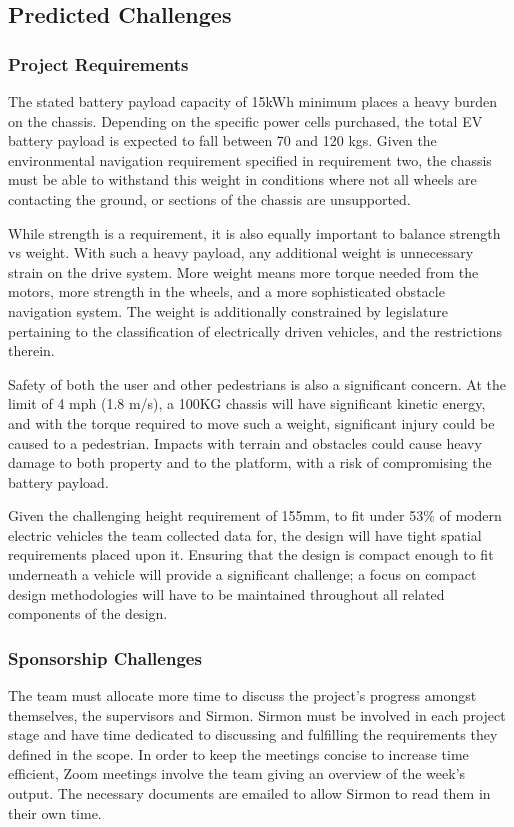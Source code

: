\documentclass [12pt]{article}
\begin{document}
\subsection{Predicted Challenges}\label{sec:predicted_challenges}

\subsubsection{Project Requirements}
The stated battery payload capacity of 15kWh minimum places a heavy burden on the chassis. Depending on the specific power cells purchased, the total EV battery payload is expected to fall between 70 and 120 kgs. Given the environmental navigation requirement specified in requirement two, the chassis must be able to withstand this weight in conditions where not all wheels are contacting the ground, or sections of the chassis are unsupported.

While strength is a requirement, it is also equally important to balance strength vs weight. With such a heavy payload, any additional weight is unnecessary strain on the drive system. More weight means more torque needed from the motors, more strength in the wheels, and a more sophisticated obstacle navigation system. The weight is additionally constrained by legislature pertaining to the classification of electrically driven vehicles, and the restrictions therein.

Safety of both the user and other pedestrians is also a significant concern. At the limit of 4 mph (1.8 m/s), a 100KG chassis will have significant kinetic energy, and with the torque required to move such a weight, significant injury could be caused to a pedestrian. Impacts with terrain and obstacles could cause heavy damage to both property and to the platform, with a risk of compromising the battery payload.

Given the challenging height requirement of 155mm, to fit under 53\% of modern electric vehicles   the team collected data for, the design will have tight spatial requirements placed upon it. Ensuring that the design is compact enough to fit underneath a vehicle will provide a significant challenge; a focus on compact design methodologies will have to be maintained throughout all related components of the design.


\subsubsection{Sponsorship Challenges}
The team must allocate more time to discuss the project’s progress amongst themselves, the supervisors and Sirmon. Sirmon must be involved in each project stage and have time dedicated to discussing and fulfilling the requirements they defined in the scope. In order to keep the meetings concise to increase time efficient, Zoom meetings involve the team giving an overview of the week’s output. The necessary documents are emailed to allow Sirmon to read them in their own time.
\end{document}
